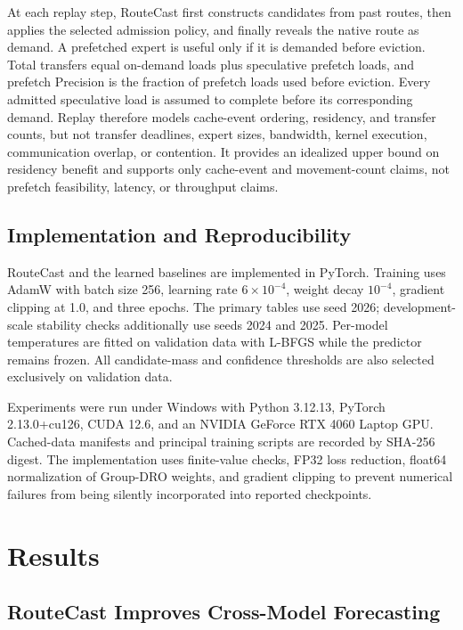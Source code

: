\documentclass[conference]{IEEEtran}
\begin{document}
At each replay step, RouteCast first constructs candidates from past routes,
then applies the selected admission policy, and finally reveals the native
route as demand. A prefetched expert is useful only if it is demanded before
eviction. Total transfers equal on-demand loads plus speculative prefetch
loads, and prefetch Precision is the fraction of prefetch loads used before
eviction. Every admitted speculative load is assumed to complete before its
corresponding demand. Replay therefore models cache-event ordering, residency,
and transfer counts, but not transfer deadlines, expert sizes, bandwidth,
kernel execution, communication overlap, or contention. It provides an
idealized upper bound on residency benefit and supports only cache-event and
movement-count claims, not prefetch feasibility, latency, or throughput claims.

\subsection{Implementation and Reproducibility}

RouteCast and the learned baselines are implemented in PyTorch. Training uses
AdamW \cite{loshchilov2019} with batch size 256, learning rate \(6\times10^{-4}\), weight decay
\(10^{-4}\), gradient clipping at 1.0, and three epochs. The primary tables
use seed 2026; development-scale stability checks additionally use seeds 2024
and 2025. Per-model temperatures are fitted on validation data with L-BFGS
while the predictor remains frozen. All candidate-mass and confidence
thresholds are also selected exclusively on validation data.

Experiments were run under Windows with Python 3.12.13, PyTorch
2.13.0+cu126, CUDA 12.6, and an NVIDIA GeForce RTX 4060 Laptop GPU. Cached-data
manifests and principal training scripts are recorded by SHA-256 digest. The
implementation uses finite-value checks, FP32 loss reduction, float64
normalization of Group-DRO weights, and gradient clipping to prevent numerical
failures from being silently incorporated into reported checkpoints.

\section{Results}
\subsection{RouteCast Improves Cross-Model Forecasting}
\end{document}
